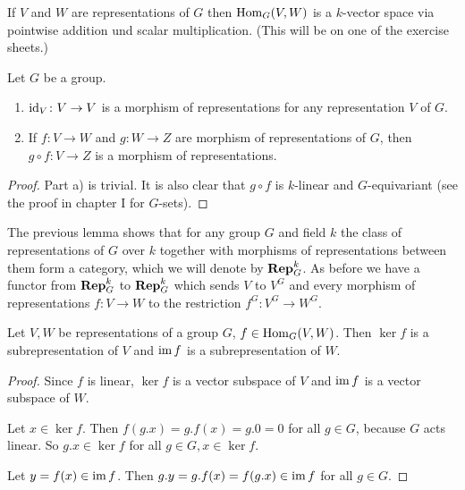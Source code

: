 \begin{rem}
 If $V$ and $W$ are representations of $G$ then $\operatorname{Hom}_G(V,W)$ is a $k$-vector space via pointwise addition und scalar multiplication. (This will be on one of the exercise sheets.)
\end{rem}


\begin{lem}\label{lem: composition of morphisms of representations}
 Let $G$ be a group.
 \begin{enumerate}[label=\emph{\alph*)},leftmargin=*]
  \item
   $\operatorname{id}_V \colon V \to V$ is a morphism of representations for any representation $V$ of $G$.
  \item
   If $f \colon V \to W$  and $g \colon W \to Z$ are morphism of representations of $G$, then $g \circ f \colon V \to Z$ is a morphism of representations.
 \end{enumerate}
\end{lem}
\begin{proof}
 Part a) is trivial. It is also clear that $g \circ f$ is $k$-linear and $G$-equivariant (see the proof in chapter I for $G$-sets).
\end{proof}


The previous lemma shows that for any group $G$ and field $k$ the class of representations of $G$ over $k$ together with morphisms of representations between them form a category, which we will denote by $\mathbf{Rep}^k_G$. As before we have a functor from $\mathbf{Rep}^k_G$ to $\mathbf{Rep}^k_G$ which sends $V$ to $V^G$ and every morphism of representations $f \colon V \to W$ to the restriction $f^G \colon V^G \to W^G$.


\begin{lem}\label{lem: ker and im subrepresentations}
 Let $V,W$ be representations of a group $G$, $f \in \operatorname{Hom}_G(V,W)$. Then $\ker f$ is a subrepresentation of $V$ and $\operatorname{im} f$ is a subrepresentation of $W$.
\end{lem}
\begin{proof}
 Since $f$ is linear, $\ker f$ is a vector subspace of $V$ and $\operatorname{im} f$ is a vector subspace of $W$.
 
 Let $x \in \ker f$. Then $f(g.x) = g.f(x) = g.0 = 0$ for all $g \in G$, because $G$ acts linear. So $g.x \in \ker f$ for all $g \in G, x \in \ker f$.
 
 Let $y = f(x) \in \operatorname{im} f$. Then $g.y = g.f(x) = f(g.x) \in \operatorname{im} f$ for all $g \in G$.
\end{proof}


